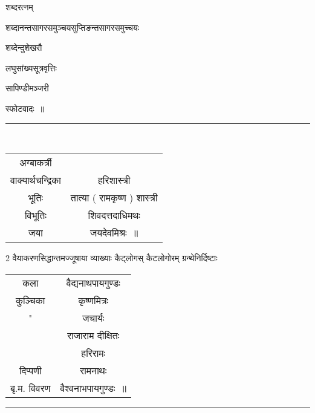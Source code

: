 \documentclass[11pt, openany]{book}
\makeatletter
\newcommand{\devanagarinumeral}[1]{
\devanagaridigits{\number \csname c@#1\endcsname}} %
\makeatother
\begin{document}
\begin{multicols}{2}
शब्दरत्नम् 

शब्दानन्तसागरसमुञ्चयसुप्तिङन्तसागरसमुच्चयः 

शब्देन्दुशेखरौ 

लघुसांख्यसूत्रवृत्तिः 

सापिण्डीमञ्जरी 

स्फोटवादः~॥ 

\noindent
\rule{1\linewidth}{0.5pt}\\

\begin{tabular}{c c}
अग्बाकर्त्री & \\
वाक्यार्थचन्द्रिका &हरिशास्त्री\\
भूतिः &तात्या ( रामकृष्ण ) शास्त्री \\
विभूतिः & शिवदत्तदाधिमथः \\
जया & जयदेवमिश्रः~॥
\end{tabular}

2 वैयाकरणसिद्धान्तमज्जूषाया व्याख्याः कैट्लोगस् कैटलोगोरम्
ग्रन्थेनिर्दिष्टाः \textendash\ 

\begin{tabular}{c c}
कला &वैद्यनाथपायगुण्डः \\
कुञ्चिका& कृष्णमित्रः \\
"& जचार्यः \\
& राजाराम दीक्षितः \\
& हरिरामः \\
दिप्पणी & रामनाथः \\
बृ.म. विवरण & वैश्वनाभपायगुण्डः~॥
\end{tabular}

\begin{center}
\rule{0.2\linewidth}{0.5pt}
\end{center}
\end{multicols}

\fancyhead[RO,LE]{\thepage}
\cfoot{}
\newpage
\renewcommand{\thepage}{\devanagarinumeral{page}}
\setcounter{page}{18}

\end{document}
